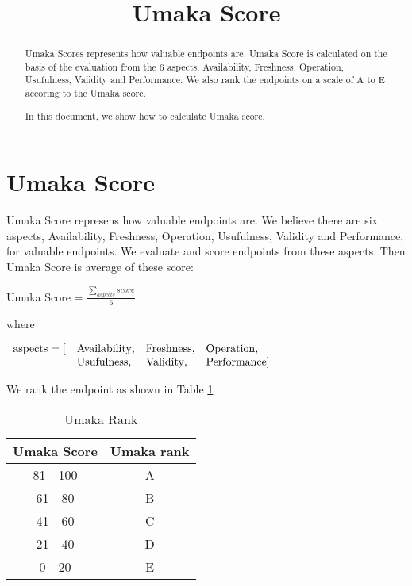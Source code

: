 \documentclass[11pt,a4paper]{article}
\title{Umaka Score}
\begin{document}
\maketitle

\begin{abstract}
Umaka Scores represents how valuable endpoints are.
Umaka Score is calculated on the basis of the evaluation from the 6 aspects, Availability, Freshness, Operation, Usufulness, Validity and Performance.
We also rank the endpoints on a scale of A to E accoring to the Umaka score.

In this document, we show how to calculate Umaka score.
\end{abstract}

\section{Umaka Score}

Umaka Score represens how valuable endpoints are.
We believe there are six aspects, Availability, Freshness, Operation, Usufulness, Validity and Performance, for  valuable endpoints. We evaluate and score endpoints from these aspects.
Then Umaka Score is average of these score:

\begin{mdframed}
  \center
Umaka Score = $\frac{\displaystyle \sum_{aspects}score}{6}$

where

$\begin{array}{llll}
{\rm aspects} = [ & {\rm Availability}, & {\rm Freshness}, & {\rm Operation}, \\
                  & {\rm Usufulness},   & {\rm Validity},  & {\rm Performance} ]
\end{array}$

\end{mdframed}

We rank the endpoint as shown in Table \ref{table:umaka_rank}

\begin{table}
  \center
  \begin{tabular}{cc}
    \hline
    Umaka Score & Umaka rank \\
    \hline
    81 - 100 & A \\
    61 - 80  & B \\
    41 - 60  & C \\
    21 - 40  & D \\
    0  - 20  & E \\
    \hline
  \end{tabular}
  \caption{Umaka Rank}
  \label{table:umaka_rank}
\end{table}
\end{document}

